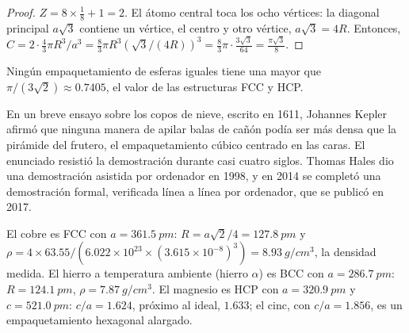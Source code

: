 \begin{proof}
$Z = 8 \times \frac18 + 1 = 2$. El átomo central toca los ocho vértices:
la diagonal principal $a\sqrt3$ contiene un vértice, el centro y otro
vértice, $a\sqrt3 = 4R$. Entonces, $C = 2 \cdot \frac43\pi R^3/a^3 =
\frac83\pi R^3 (\sqrt3/(4R))^3 = \frac83\pi \cdot \frac{3\sqrt3}{64} =
\frac{\pi\sqrt3}{8}$.
\end{proof}

\begin{proposition}\label{prop:b1:crystals-metals:kepler}
Ningún empaquetamiento de esferas iguales tiene una  mayor que
$\pi/(3\sqrt2) \approx 0.7405$, el valor de las estructuras FCC y HCP.
\end{proposition}
\admitted

\begin{history}
En un breve ensayo sobre los copos de nieve, escrito en 1611, Johannes
Kepler afirmó que ninguna manera de apilar balas de cañón podía ser más
densa que la pirámide del frutero, el empaquetamiento cúbico centrado en
las caras. El enunciado resistió la demostración durante casi cuatro
siglos. Thomas Hales dio una demostración asistida por ordenador en 1998,
y en 2014 se completó una demostración formal, verificada línea a línea
por ordenador, que se publicó en 2017.
\end{history}

\begin{example}\label{ex:b1:crystals-metals:metals}
El cobre es FCC con $a = \qty{361.5}{pm}$: $R = a\sqrt2/4 =
\qty{127.8}{pm}$ y $\rho = 4 \times 63.55/(6.022 \times 10^{23} \times
(3.615 \times 10^{-8})^3) = \qty{8.93}{g/cm^3}$, la densidad medida. El
hierro a temperatura ambiente (hierro $\alpha$) es BCC con
$a = \qty{286.7}{pm}$: $R = \qty{124.1}{pm}$, $\rho = \qty{7.87}{g/cm^3}$.
El magnesio es HCP con $a = \qty{320.9}{pm}$ y $c = \qty{521.0}{pm}$:
$c/a = 1.624$, próximo al ideal, $1.633$; el cinc, con $c/a = 1.856$, es
un empaquetamiento hexagonal alargado.
\end{example}

